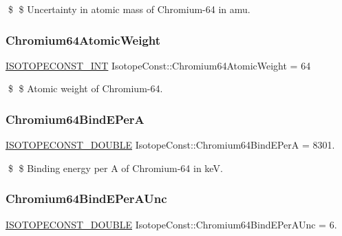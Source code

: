 \$ \$ Uncertainty in atomic mass of Chromium-\/64 in amu. \mbox{\label{group___isotope_const-_chromium-_cr64_gaac7cf3a4a7bd6710bb53cade53d6a304}} 
\subsubsection{\texorpdfstring{Chromium64\+Atomic\+Weight}{Chromium64AtomicWeight}}
{\footnotesize\ttfamily \mbox{\hyperlink{group___isotope_const-_macros_ga5f18360b3e99483a35c32d789e62621c}{I\+S\+O\+T\+O\+P\+E\+C\+O\+N\+S\+T\+\_\+\+I\+NT}} Isotope\+Const\+::\+Chromium64\+Atomic\+Weight = 64}

\$ \$ Atomic weight of Chromium-\/64. \mbox{\label{group___isotope_const-_chromium-_cr64_gaa379198658c0ae826df2d745fd07545f}} 
\subsubsection{\texorpdfstring{Chromium64\+Bind\+E\+PerA}{Chromium64BindEPerA}}
{\footnotesize\ttfamily \mbox{\hyperlink{group___isotope_const-_macros_ga8f45a7272ce02c0b4c65c44636ed719a}{I\+S\+O\+T\+O\+P\+E\+C\+O\+N\+S\+T\+\_\+\+D\+O\+U\+B\+LE}} Isotope\+Const\+::\+Chromium64\+Bind\+E\+PerA = 8301.}

\$ \$ Binding energy per A of Chromium-\/64 in keV. \mbox{\label{group___isotope_const-_chromium-_cr64_ga699564bba0e6ee6210ea8c58803cc9b7}} 
\subsubsection{\texorpdfstring{Chromium64\+Bind\+E\+Per\+A\+Unc}{Chromium64BindEPerAUnc}}
{\footnotesize\ttfamily \mbox{\hyperlink{group___isotope_const-_macros_ga8f45a7272ce02c0b4c65c44636ed719a}{I\+S\+O\+T\+O\+P\+E\+C\+O\+N\+S\+T\+\_\+\+D\+O\+U\+B\+LE}} Isotope\+Const\+::\+Chromium64\+Bind\+E\+Per\+A\+Unc = 6.}

